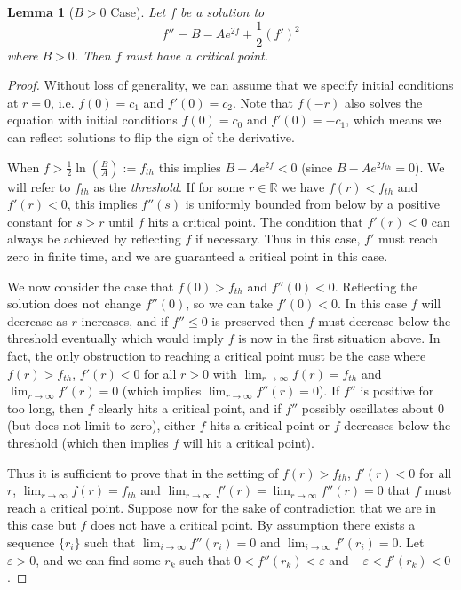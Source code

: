 \documentclass[12pt, a4paper, reqno, oneside]{amsart}
\newcommand{\R}{\mathbb{R}}
\renewcommand{\epsilon}{\varepsilon}
\numberwithin{equation}{section}
\theoremstyle{plain}
\newtheorem{lemma}[theorem]{Lemma}
\theoremstyle{definition}
\theoremstyle{plain}
\begin{document}
\begin{lemma}[$B>0$ Case]\label{f_crit_point_pos_lemma}
  Let $f$ be a solution to
  \[
    f'' = B-Ae^{2f}+\frac{1}{2}(f')^{2}
  \]
  where $B>0$. Then $f$ must have a critical point.
\end{lemma}
\begin{proof}
  Without loss of generality, we can assume that we specify initial conditions at $r=0$, i.e. $f(0)=c_1$ and $f'(0)=c_2$. Note that $f(-r)$ also solves the equation with initial conditions $f(0)=c_0$ and $f'(0)=-c_1$, which means we can reflect solutions to flip the sign of the derivative. 

  When $f>\tfrac{1}{2}\ln(\tfrac{B}{A}):=f_{th}$ this implies $B-Ae^{2f}<0$ (since $B-Ae^{2f_{th}}=0$). We will refer to $f_{th}$ as the \textit{threshold}. If for some $r\in\R$ we have $f(r)<f_{th}$ and $f'(r)<0$, this implies $f''(s)$ is uniformly bounded from below by a positive constant for $s>r$ until $f$ hits a critical point. The condition that $f'(r)<0$ can always be achieved by reflecting $f$ if necessary. Thus in this case, $f'$ must reach zero in finite time, and we are guaranteed a critical point in this case.

  We now consider the case that $f(0)>f_{th}$ and $f''(0)<0$. Reflecting the solution does not change $f''(0)$, so we can take $f'(0)<0$. In this case $f$ will decrease as $r$ increases, and if $f''\leq 0$ is preserved then $f$ must decrease below the threshold eventually which would imply $f$ is now in the first situation above. In fact, the only obstruction to reaching a critical point must be the case where $f(r)>f_{th}$, $f'(r)<0$ for all $r>0$ with $\lim_{r\to\infty}f(r)=f_{th}$ and $\lim_{r\to\infty}f'(r)=0$ (which implies $\lim_{r\to\infty}f''(r)=0$). If $f''$ is positive for too long, then $f$ clearly hits a critical point, and if $f''$ possibly oscillates about 0 (but does not limit to zero), either $f$ hits a critical point or $f$ decreases below the threshold (which then implies $f$ will hit a critical point).

  Thus it is sufficient to prove that in the setting of $f(r)>f_{th}$, $f'(r)<0$ for all $r$, $\lim_{r\to\infty}f(r)=f_{th}$ and $\lim_{r\to\infty}f'(r)=\lim_{r\to\infty}f''(r)=0$ that $f$ must reach a critical point. Suppose now for the sake of contradiction that we are in this case but $f$ does not have a critical point. By assumption there exists a sequence $\{r_{i}\}$ such that $\lim_{i\to\infty}f''(r_{i})=0$ and $\lim_{i\to\infty}f'(r_{i})=0$. Let $\epsilon>0$, and we can find some $r_{k}$ such that $0<f''(r_{k})<\epsilon$ and $-\epsilon<f'(r_{k})<0$. 


\end{proof}
\end{document}
